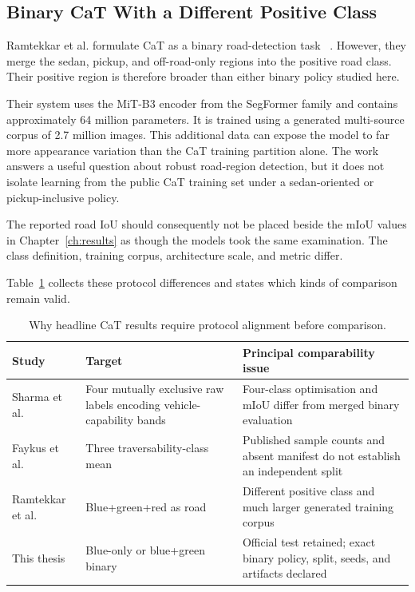 \subsection{Binary CaT With a Different Positive Class}

Ramtekkar et al. formulate CaT as a binary road-detection task
~\cite{ramtekkar2024depth}. However, they merge the sedan, pickup, and
off-road-only regions into the positive road class. Their positive region is
therefore broader than either binary policy studied here.

Their system uses the MiT-B3 encoder from the SegFormer family and contains
approximately 64 million parameters. It is trained using a generated
multi-source corpus of 2.7 million images. This additional data can expose the
model to far more appearance variation than the CaT training partition alone.
The work answers a useful question about robust road-region detection, but it
does not isolate learning from the public CaT training set under a
sedan-oriented or pickup-inclusive policy.

The reported road IoU should consequently not be placed beside the mIoU values
in Chapter~\ref{ch:results} as though the models took the same examination.
The class definition, training corpus, architecture scale, and metric differ.

Table~\ref{tab:comparability} collects these protocol differences and states
which kinds of comparison remain valid.

\begin{table}[H]
\centering
\caption{Why headline CaT results require protocol alignment before comparison.}
\label{tab:comparability}
\small
\begin{tabularx}{\textwidth}{@{}
  >{\raggedright\arraybackslash}p{}
  >{\raggedright\arraybackslash}p{}
  >{\raggedright\arraybackslash}X@{}}
\toprule
\textbf{Study} & \textbf{Target} & \textbf{Principal comparability issue} \\
\midrule
Sharma et al.~\cite{sharma2022cat} & Four mutually exclusive raw labels encoding vehicle-capability bands & Four-class optimisation and mIoU differ from merged binary evaluation \\
Faykus et al.~\cite{efficientvit_offroad} & Three traversability-class mean & Published sample counts and absent manifest do not establish an independent split \\
Ramtekkar et al.~\cite{ramtekkar2024depth} & Blue+green+red as road & Different positive class and much larger generated training corpus \\
This thesis & Blue-only or blue+green binary & Official test retained; exact binary policy, split, seeds, and artifacts declared \\
\bottomrule
\end{tabularx}
\end{table}

